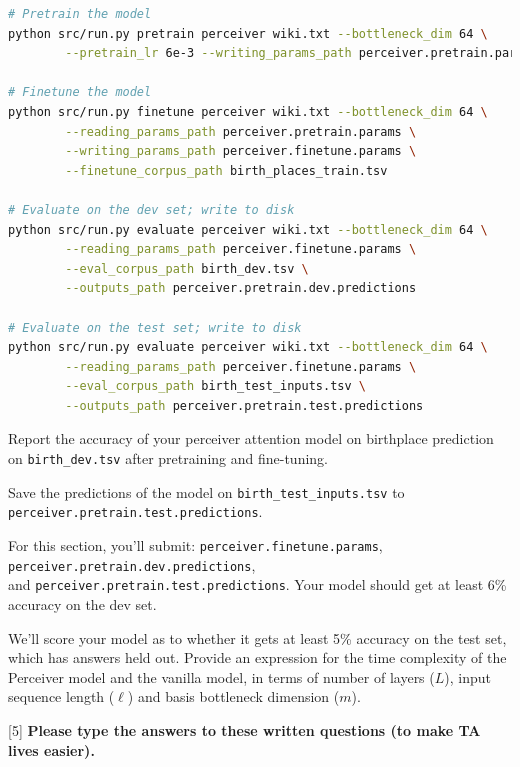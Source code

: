 \begin{parts}
\begin{lstlisting}[basicstyle=\ttfamily, language=bash]
# Pretrain the model
python src/run.py pretrain perceiver wiki.txt --bottleneck_dim 64 \
        --pretrain_lr 6e-3 --writing_params_path perceiver.pretrain.params
        
# Finetune the model
python src/run.py finetune perceiver wiki.txt --bottleneck_dim 64 \
        --reading_params_path perceiver.pretrain.params \
        --writing_params_path perceiver.finetune.params \
        --finetune_corpus_path birth_places_train.tsv
        
# Evaluate on the dev set; write to disk
python src/run.py evaluate perceiver wiki.txt --bottleneck_dim 64 \
        --reading_params_path perceiver.finetune.params \
        --eval_corpus_path birth_dev.tsv \
        --outputs_path perceiver.pretrain.dev.predictions
        
# Evaluate on the test set; write to disk
python src/run.py evaluate perceiver wiki.txt --bottleneck_dim 64 \
        --reading_params_path perceiver.finetune.params \
        --eval_corpus_path birth_test_inputs.tsv \
        --outputs_path perceiver.pretrain.test.predictions
\end{lstlisting}

Report the accuracy of your perceiver attention model on birthplace prediction on \texttt{birth\_dev.tsv} after pretraining and fine-tuning.

Save the predictions of the model on \texttt{birth\_test\_inputs.tsv} to \texttt{perceiver.pretrain.test.predictions}.

For this section, you'll submit: \texttt{perceiver.finetune.params}, \texttt{perceiver.pretrain.dev.predictions},\\ and \texttt{perceiver.pretrain.test.predictions}. Your model should get at least 6\% accuracy on the dev set.
    
\begin{subparts}

\subpart[8]  We'll score your model as to whether it gets at least 5\% accuracy on the test set, which has answers held out.
\subpart[2] Provide an expression for the time complexity of the Perceiver model and the vanilla model, in terms of number of layers ($L$), input sequence length ($\ell$) and basis bottleneck dimension ($m$). 

\ifans{}


\end{subparts}
\end{parts}
[5]
{\color{red} \textbf{Please type the answers to these written questions (to make TA lives easier).}}

